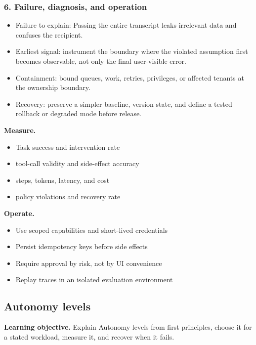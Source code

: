 \subsubsection*{6. Failure, diagnosis, and operation}
\begin{itemize}
\item Failure to explain: Passing the entire transcript leaks irrelevant data and confuses the recipient.
\item Earliest signal: instrument the boundary where the violated assumption first becomes observable, not only the final user-visible error.
\item Containment: bound queues, work, retries, privileges, or affected tenants at the ownership boundary.
\item Recovery: preserve a simpler baseline, version state, and define a tested rollback or degraded mode before release.
\end{itemize}
\textbf{Measure.}\begin{itemize}
\item Task success and intervention rate
\item tool-call validity and side-effect accuracy
\item steps, tokens, latency, and cost
\item policy violations and recovery rate
\end{itemize}
\textbf{Operate.}\begin{itemize}
\item Use scoped capabilities and short-lived credentials
\item Persist idempotency keys before side effects
\item Require approval by risk, not by UI convenience
\item Replay traces in an isolated evaluation environment
\end{itemize}
\subsection{Autonomy levels}
\textbf{Learning objective.} Explain Autonomy levels from first principles, choose it for a stated workload, measure it, and recover when it fails.
